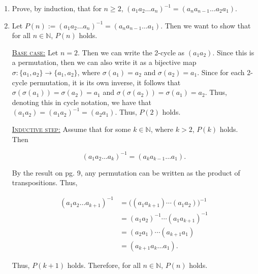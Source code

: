 \documentclass[12pt]{article}
\makeatletter
\theoremstyle{definition}
\theoremstyle{remark}
\renewenvironment{proof}[1][\proofname]{\par
  \pushQED{\qed}%
  \normalfont \topsep6\p@\@plus6\p@\relax
  \list{}{\leftmargin=0mm
          \rightmargin=0mm
          \settowidth{\itemindent}{\itshape#1}%
          \labelwidth=\itemindent
          \parsep=0pt \listparindent=\parindent 
  }
  \item[\hskip\labelsep
        \itshape
    #1\@addpunct{.}]\ignorespaces
}{%
  \popQED\endlist\@endpefalse
}
\let\oldproofname=\proofname
\renewcommand{\proofname}{\bf{\textit{\oldproofname}}}
\makeatother
\begin{document}
\begin{enumerate}[leftmargin=*]
        \item Prove, by induction, that for $n\geq 2$, $(a_1a_2\dots a_n)^{-1}=(a_na_{n-1}\dots a_2a_1)$.
            \begin{proof}
                Let $P(n):=(a_1a_2\dots a_n)^{-1}=(a_na_{n-1}\dots a_1)$. Then we want to show that for all $n\in\mathbb{N}$, $P(n)$ holds.\par\vspace{2mm}
                
                \underline{\textsc{Base case:}} Let $n=2$. Then we can write the 2-cycle as $(a_1a_2)$. Since this is a permutation, then we can also write it as a bijective map $\sigma\colon \{a_1,a_2\}\rightarrow\{a_1,a_2\}$, where $\sigma(a_1)=a_2$ and $\sigma(a_2)=a_1$. Since for each 2-cycle permutation, it is its own inverse, it follows that $\sigma(\sigma(a_1))=\sigma(a_2)=a_1$ and $\sigma(\sigma(a_2))=\sigma(a_1)=a_2$. Thus, denoting this in cycle notation, we have that $(a_1a_2)=(a_1a_2)^{-1}=(a_2a_1)$. Thus, $P(2)$ holds.\par\vspace{2mm}
                
                \underline{\textsc{Inductive step:}} Assume that for some $k\in\mathbb{N}$, where $k>2$, $P(k)$ holds. Then
                
                \begin{equation}
                    (a_1a_2\dots a_k)^{-1}=(a_ka_{k-1}\dots a_1). 
                \end{equation}
                
                By the result on pg. 9, any permutation can be written as the product of transpositions. Thus, 
                
                \begin{equation*}
                    \begin{split}
                        (a_1a_2\dots a_{k+1})^{-1} &= \big((a_1a_{k+1})\cdots(a_1a_2)\big)^{-1} \\
                        &=(a_1a_2)^{-1}\cdots(a_1a_{k+1})^{-1} \\
                        &=(a_2a_1)\cdots (a_{k+1}a_1) \\
                        &=(a_{k+1}a_k\dots a_1).
                    \end{split}
                \end{equation*}
                
                Thus, $P(k+1)$ holds. Therefore, for all $n\in\mathbb{N}$, $P(n)$ holds.
            \end{proof}
            

\end{enumerate}
\end{document}
